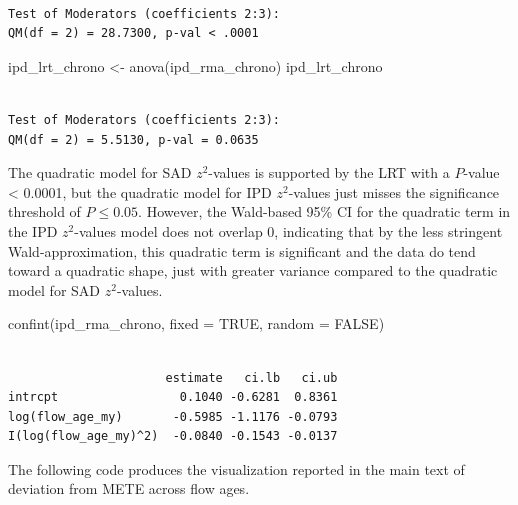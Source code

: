 \documentclass[
  letterpaper,
  DIV=11,
  numbers=noendperiod]{scrartcl}
\newenvironment{Shaded}{\begin{snugshade}}{\end{snugshade}}
\newcommand{\AttributeTok}[1]{\textcolor[rgb]{0.40,0.45,0.13}{#1}}
\newcommand{\ConstantTok}[1]{\textcolor[rgb]{0.56,0.35,0.01}{#1}}
\newcommand{\FunctionTok}[1]{\textcolor[rgb]{0.28,0.35,0.67}{#1}}
\newcommand{\NormalTok}[1]{\textcolor[rgb]{0.00,0.23,0.31}{#1}}
\newcommand{\OtherTok}[1]{\textcolor[rgb]{0.00,0.23,0.31}{#1}}
\begin{document}
\begin{verbatim}

Test of Moderators (coefficients 2:3):
QM(df = 2) = 28.7300, p-val < .0001
\end{verbatim}

\begin{Shaded}
\begin{Highlighting}[]
\NormalTok{ipd\_lrt\_chrono }\OtherTok{\textless{}{-}} \FunctionTok{anova}\NormalTok{(ipd\_rma\_chrono)}
\NormalTok{ipd\_lrt\_chrono}
\end{Highlighting}
\end{Shaded}

\begin{verbatim}

Test of Moderators (coefficients 2:3):
QM(df = 2) = 5.5130, p-val = 0.0635
\end{verbatim}

The quadratic model for SAD \(z^2\)-values is supported by the LRT with
a \(P\)-value \textless{} 0.0001, but the quadratic model for IPD
\(z^2\)-values just misses the significance threshold of
\(P \leq 0.05\). However, the Wald-based 95\% CI for the quadratic term
in the IPD \(z^2\)-values model does not overlap 0, indicating that by
the less stringent Wald-approximation, this quadratic term is
significant and the data do tend toward a quadratic shape, just with
greater variance compared to the quadratic model for SAD \(z^2\)-values.

\begin{Shaded}
\begin{Highlighting}[]
\FunctionTok{confint}\NormalTok{(ipd\_rma\_chrono, }\AttributeTok{fixed =} \ConstantTok{TRUE}\NormalTok{, }\AttributeTok{random =} \ConstantTok{FALSE}\NormalTok{)}
\end{Highlighting}
\end{Shaded}

\begin{verbatim}

                      estimate   ci.lb   ci.ub 
intrcpt                 0.1040 -0.6281  0.8361 
log(flow_age_my)       -0.5985 -1.1176 -0.0793 
I(log(flow_age_my)^2)  -0.0840 -0.1543 -0.0137 
\end{verbatim}

The following code produces the visualization reported in the main text
of deviation from METE across flow ages.
\end{document}
